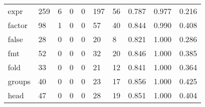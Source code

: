 \begin{longtable}{lp{1.3cm}p{1.3cm}p{1.3cm}p{1.3cm}p{1.3cm}p{1.3cm}p{1.3cm}p{1.3cm}p{1.3cm}}
expr      &                    259 &                                             6 &                                            0 &                                           0 &                                          197 &                                         56 &                                0.787 &                                  0.977 &                                0.216 \\
factor    &                     98 &                                             1 &                                            0 &                                           0 &                                           57 &                                         40 &                                0.844 &                                  0.990 &                                0.408 \\
false     &                     28 &                                             0 &                                            0 &                                           0 &                                           20 &                                          8 &                                0.821 &                                  1.000 &                                0.286 \\
fmt       &                     52 &                                             0 &                                            0 &                                           0 &                                           32 &                                         20 &                                0.846 &                                  1.000 &                                0.385 \\
fold      &                     33 &                                             0 &                                            0 &                                           0 &                                           21 &                                         12 &                                0.841 &                                  1.000 &                                0.364 \\
groups    &                     40 &                                             0 &                                            0 &                                           0 &                                           23 &                                         17 &                                0.856 &                                  1.000 &                                0.425 \\
head      &                     47 &                                             0 &                                            0 &                                           0 &                                           28 &                                         19 &                                0.851 &                                  1.000 &                                0.404 \\

\end{longtable}
